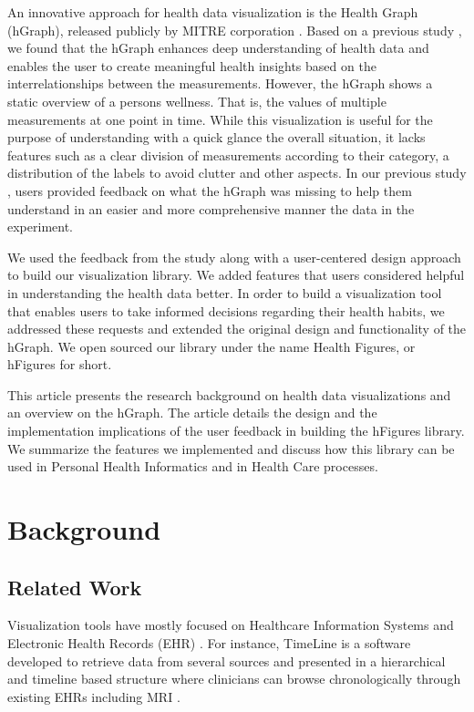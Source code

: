 \documentclass[twocolumn]{bmcart}%
\begin{document}
An innovative approach for health data visualization is the Health Graph (hGraph), released publicly by MITRE corporation \cite{follett2012hgraph}. Based on a previous study \cite{EMBCLedNiem}, we found that the hGraph enhances deep understanding of health data and enables the user to create meaningful health insights based on the interrelationships between the measurements. However, the hGraph shows a static overview of a persons wellness. That is, the values of multiple measurements at one point in time. While this visualization is useful for the purpose of understanding with a quick glance the overall situation, it lacks features such as a clear division of measurements according to their category, a distribution of the labels to avoid clutter and other aspects. In our previous study \cite{EMBCLedNiem}, users provided feedback on what the hGraph was missing to help them understand in an easier and more comprehensive manner the data in the experiment.

We used the feedback from the study along with a user-centered design approach to build our visualization library. We added features that users considered helpful in understanding the health data better. In order to build a visualization tool that enables users to take informed decisions regarding their health habits, we addressed these requests and extended the original design and functionality of the hGraph. We open sourced our library under the name Health Figures, or hFigures for short. 

This article presents the research background on health data visualizations and an overview on the hGraph. The article details the design and the implementation implications of the user feedback in building the hFigures library. We summarize the features we implemented and discuss how this library can be used in Personal Health Informatics and in Health Care processes.


\section*{Background}

\subsection*{Related Work}


Visualization tools have mostly focused on Healthcare Information Systems and Electronic Health Records (EHR) \cite{lesselroth2011data}. For instance, TimeLine is a software developed to retrieve data from several sources and presented in a hierarchical and timeline based structure where clinicians can browse chronologically through existing EHRs including MRI \cite{bui2007information}.
\end{document}
